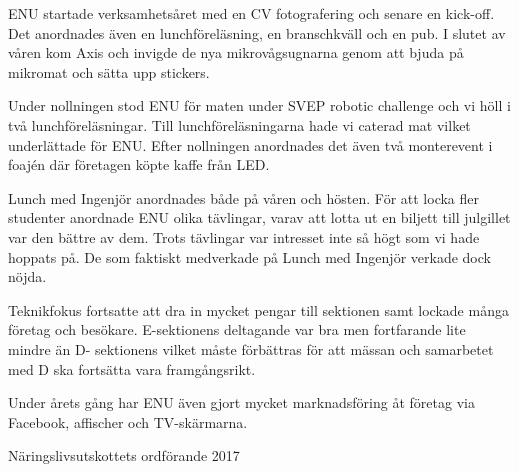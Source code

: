 \documentclass[../_main/handlingar.tex]{subfiles}
\begin{document}
ENU startade verksamhetsåret med en CV fotografering och senare en kick-off. Det
anordnades även en lunchföreläsning, en branschkväll och en pub. I slutet av våren kom Axis
och invigde de nya mikrovågsugnarna genom att bjuda på mikromat och
sätta upp stickers.

Under nollningen stod ENU för maten under SVEP robotic challenge och vi höll i två
lunchföreläsningar. Till lunchföreläsningarna hade vi caterad mat vilket underlättade för
ENU. Efter nollningen anordnades det även två monterevent i foajén där företagen köpte
kaffe från LED.

Lunch med Ingenjör anordnades både på våren och hösten. För att locka fler studenter
anordnade ENU olika tävlingar, varav att lotta ut en biljett till julgillet var den bättre av
dem. Trots tävlingar var intresset inte så högt som vi hade hoppats på. De som faktiskt
medverkade på Lunch med Ingenjör verkade dock nöjda.

Teknikfokus fortsatte att dra in mycket pengar till sektionen samt lockade många företag och besökare. E-sektionens deltagande var bra men fortfarande lite mindre än D-
sektionens vilket måste förbättras för att mässan och samarbetet med D ska fortsätta vara framgångsrikt.

Under årets gång har ENU även gjort mycket marknadsföring åt företag via Facebook,
affischer och TV-skärmarna.
\begin{signatures}{1}
    \mvh
    \signature{Josefine Sandström}{Näringslivsutskottets ordförande 2017}
\end{signatures}
\end{document}
